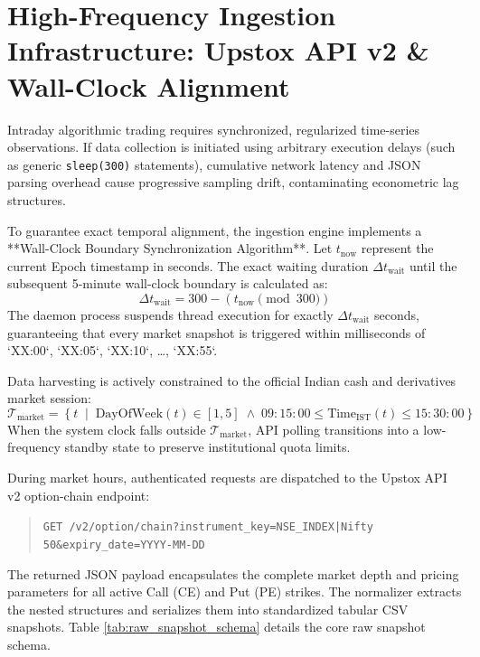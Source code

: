 \section{High-Frequency Ingestion Infrastructure: Upstox API v2 \& Wall-Clock Alignment}
\label{sec:ingestion_infrastructure}

Intraday algorithmic trading requires synchronized, regularized time-series observations. If data collection is initiated using arbitrary execution delays (such as generic \texttt{sleep(300)} statements), cumulative network latency and JSON parsing overhead cause progressive sampling drift, contaminating econometric lag structures.

To guarantee exact temporal alignment, the ingestion engine implements a **Wall-Clock Boundary Synchronization Algorithm**. Let $t_{\text{now}}$ represent the current Epoch timestamp in seconds. The exact waiting duration $\Delta t_{\text{wait}}$ until the subsequent 5-minute wall-clock boundary is calculated as:
\begin{equation}
    \Delta t_{\text{wait}} = 300 - \left(t_{\text{now}} \pmod{300}\right)
    \label{eq:wall_clock_sync}
\end{equation}
The daemon process suspends thread execution for exactly $\Delta t_{\text{wait}}$ seconds, guaranteeing that every market snapshot is triggered within milliseconds of `XX:00`, `XX:05`, `XX:10`, \dots, `XX:55`.

Data harvesting is actively constrained to the official Indian cash and derivatives market session:
\begin{equation}
    \mathcal{T}_{\text{market}} = \left\{ t \;\middle|\; \text{DayOfWeek}(t) \in [1, 5] \;\land\; 09:15:00 \le \text{Time}_{\text{IST}}(t) \le 15:30:00 \right\}
\end{equation}
When the system clock falls outside $\mathcal{T}_{\text{market}}$, API polling transitions into a low-frequency standby state to preserve institutional quota limits.

During market hours, authenticated requests are dispatched to the Upstox API v2 option-chain endpoint:
\begin{quote}
    \texttt{GET /v2/option/chain?instrument\_key=NSE\_INDEX|Nifty 50\&expiry\_date=YYYY-MM-DD}
\end{quote}
The returned JSON payload encapsulates the complete market depth and pricing parameters for all active Call (CE) and Put (PE) strikes. The normalizer extracts the nested structures and serializes them into standardized tabular CSV snapshots. Table \ref{tab:raw_snapshot_schema} details the core raw snapshot schema.


